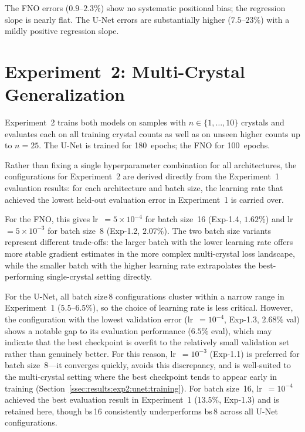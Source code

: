 The FNO errors ($0.9$–$2.3\%$) show no systematic positional bias; the regression slope is nearly flat. The U-Net errors are substantially higher ($7.5$–$23\%$) with a mildly positive regression slope.

\section{Experiment~2: Multi-Crystal Generalization}
\label{sec:results:exp2}

Experiment~2 trains both models on samples with $n \in \{1, \ldots, 10\}$ crystals and evaluates each on all training crystal counts as well as on unseen higher counts up to $n = 25$. The U-Net is trained for 180~epochs; the FNO for 100~epochs.

Rather than fixing a single hyperparameter combination for all architectures, the configurations for Experiment~2 are derived directly from the Experiment~1 evaluation results: for each architecture and batch size, the learning rate that achieved the lowest held-out evaluation error in Experiment~1 is carried over.

For the FNO, this gives lr~$= 5\times10^{-4}$ for batch size~16 (Exp-1.4, $1.62\%$) and lr~$= 5\times10^{-3}$ for batch size~8 (Exp-1.2, $2.07\%$). The two batch size variants represent different trade-offs: the larger batch with the lower learning rate offers more stable gradient estimates in the more complex multi-crystal loss landscape, while the smaller batch with the higher learning rate extrapolates the best-performing single-crystal setting directly.

For the U-Net, all batch size\,8 configurations cluster within a narrow range in Experiment~1 ($5.5$–$6.5\%$), so the choice of learning rate is less critical. However, the configuration with the lowest validation error (lr~$= 10^{-4}$, Exp-1.3, $2.68\%$ val) shows a notable gap to its evaluation performance ($6.5\%$ eval), which may indicate that the best checkpoint is overfit to the relatively small validation set rather than genuinely better. For this reason, lr~$= 10^{-3}$ (Exp-1.1) is preferred for batch size~8—it converges quickly, avoids this discrepancy, and is well-suited to the multi-crystal setting where the best checkpoint tends to appear early in training (Section~\ref{ssec:results:exp2:unet:training}). For batch size~16, lr~$= 10^{-4}$ achieved the best evaluation result in Experiment~1 ($13.5\%$, Exp-1.3) and is retained here, though bs\,16 consistently underperforms bs\,8 across all U-Net configurations.
\newpage
